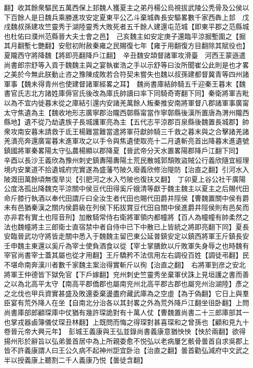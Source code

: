 翻】收其餘衆驅民五萬西保上邽魏人獲夏主之弟丹楊公烏視拔武陵公秃骨及公侯以下百餘人是日魏兵乘勝進攻安定夏東平公乙斗棄城犇長安驅畧數千家西犇上邽　戊戌魏叔孫建攻竺靈秀于湖陸靈秀大敗死者五千餘人建還屯范城【即東平郡之范縣城也杜佑曰濮州范縣晉大夫士會之邑】　己亥魏主如安定庚子還臨平涼掘塹圍之【掘其月翻塹七艷翻】安慰初附赦秦雍之民賜復七年【雍于用翻復方目翻除其賦役也】夏隴西守將降魏【將即亮翻降戶江翻】　辛丑魏安頡督諸軍攻滑臺　河西王蒙遜遣尚書郎宗舒等入貢于魏魏主與之宴執崔浩之手以示舒等曰汝所聞崔公此則是也才畧之美於今無此朕動止咨之豫陳成敗若合符契未嘗失也魏以叔孫建都督冀青等四州諸軍事【魏未得青州也使建督諸軍經畧之耳】　魏尚書庫結帥騎五千迎秦王暮末【魏書官氏志北方諸姓庫傉官氏後改為庫氏帥讀曰率下同騎奇寄翻下同】秦衛將軍吉毗以為不宜内徙暮末從之庫結引還内安諸羌萬餘人叛秦推安南將軍督八郡諸軍事廣甯太守焦遺為主【魏收地形志廣寧郡治隴西鄣縣甯當作寧鄣縣後漢所置唐為渭州隴西縣地】遺不從乃劫遺族子長城護軍亮為主【五代志平涼郡百泉縣後魏置長城郡】帥衆攻南安暮末請救于氐王楊難當難當遣將軍苻獻帥騎三千救之暮末與之合擊諸羌諸羌潰亮奔還廣甯暮末進軍攻之以手令與焦遺使取亮十二月遺斬亮首出降暮末進遺號鎮國將軍秦畧陽太守弘農楊顯以郡降夏【晉武帝分天水置畧陽郡降戶江翻下同】　辛酉以長沙王義欣為豫州刺史鎮夀陽夀陽土荒民散城郭頹敗盜賊公行義欣隨宜經理境内安業道不拾遺城府完實遂為盛藩芍陂久廢義欣修治隄防【治直之翻】引河水入陂溉田萬餘頃無復旱災【引肥河之水入芍陂也復扶又翻】　丁卯夏上谷公社干廣陽公度洛孤出降魏克平涼關中侯豆代田得奚斤娥清等獻于魏主魏主以夏主之后賜代田命斤膝行執酒以奉代田謂斤曰全汝生者代田也賜代田爵井陘侯【曹魏置關中侯有爵未有邑猶秦漢之關内侯爵級在列侯下拓拔賞豆代田自關中侯進爵井陘侯則有邑矣而亦非君有實土也陘音刑】加散騎常侍右衛將軍領内都幢將【百人為幢幢有帥柔然之法也魏幢將主三郎衛士直宿禁中者自侍中已下中散已上皆統之將即亮翻下同】夏長安臨晉武功守將皆走關中悉入于魏魏主留巴東公延普鎮安定以鎮西將軍王斤鎮長安壬申魏主東還以奚斤為宰士使負酒食以從【宰士掌膳飲以斤敗軍失身辱之也時魏有宰官尚書宰士蓋其屬也從才用翻】王斤驕矜不法信用左右調役百姓【調徒弔翻】民不堪命南奔漢川者數千家魏主案治得實斬斤以徇【治直之翻】　右將軍到彦之安北將軍王仲德皆下獄免官【下戶嫁翻】兖州刺史竺靈秀坐棄軍伏誅上見垣護之書而善之以為北高平太守【南高平郡僑郡也屬南兖州北高平郡古郡也屬兖州治湖陸】彥之之北伐也甲兵資實甚盛及敗還委棄盪盡府藏武庫為之空虛【為于偽翻】它日上與羣臣宴有荒外降人在坐【自南北分治各以其封畧之外為荒外降戶江翻坐徂卧翻】上問尚書庫部郎顧琛庫中仗猶有幾許琛詭對有十萬人仗【曹魏置尚書二十三郎庫部其一也掌戎器鹵簿儀仗琛丑林翻】上既問而悔之得琛對甚喜琛和之曾孫也【顧和見九十卷晉元帝大興元年】　彭城王義康與王弘並錄尚書義康意猶怏怏【怏於兩翻】欲得揚州形於辭旨以弘弟曇首居中為上所親委愈不悦弘以老病屢乞骸骨曇首自求吳郡上皆不許義康謂人曰王公久病不起神州詎宜卧治【治直之翻】曇首勸弘減府中文武之半以授義康上聽割二千人義康乃悦【曇徒含翻】

